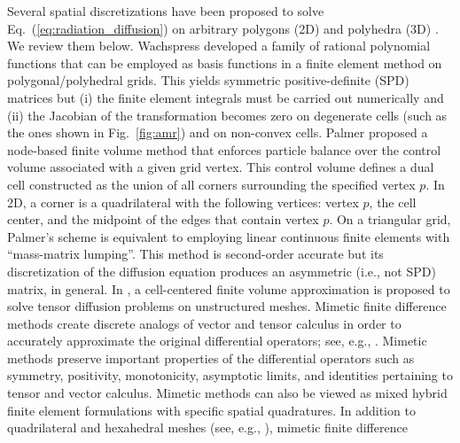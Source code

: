 \documentclass[preprint,10pt]{elsarticle}
\newcommand{\eqt}[1]{Eq.~(\ref{#1})}                     %
\newcommand{\fig}[1]{Fig.~\ref{#1}}                      %
\begin{document}
Several spatial discretizations have been proposed to solve \eqt{eq:radiation_diffusion} on
arbitrary polygons (2D) and polyhedra (3D) \cite{Wachspress,Palmer2001,Kuznetsov2004,Brezzi2005,
LipnikovShashkovSvyatskiy2006,BaileyPhD,BaileyAdams2008,LipnikovShashkov2010}. We review them below.
%
Wachspress \cite{Wachspress} developed a family of rational polynomial functions that can be employed
as basis functions in a finite element method on polygonal/polyhedral grids. This yields
symmetric positive-definite (SPD) matrices but (i) the finite element integrals must be carried out 
numerically and (ii) the Jacobian of the transformation becomes zero on degenerate cells 
(such as the ones shown in \fig{fig:amr}) and on non-convex cells. 
%
Palmer \cite{Palmer2001,PalmerLLNL} proposed a node-based finite volume method 
that enforces particle balance over the control volume associated with a given grid vertex.
This control volume defines a dual cell constructed as 
the union of all corners surrounding the specified vertex $p$. In 2D, a corner 
is a quadrilateral with the following vertices: vertex $p$, the cell center, and the midpoint
of the edges that contain vertex $p$. On a triangular grid, Palmer's scheme is equivalent 
to employing linear continuous finite elements with ``mass-matrix lumping''. This method is 
second-order accurate but its discretization of the diffusion equation produces an 
asymmetric (i.e., not SPD) matrix, in general.
%
In \cite{Herbin2006}, a cell-centered finite volume approximation is proposed to solve tensor diffusion problems
on unstructured meshes.
%
Mimetic finite difference methods create discrete analogs of vector and tensor
calculus in order to accurately approximate the original differential operators;
see, e.g., \cite{HymanMorelShashkovSteinberg2002}.
Mimetic methods preserve important properties of the differential operators such 
as symmetry, positivity, monotonicity, asymptotic limits, and identities pertaining 
to tensor and vector calculus. Mimetic methods can also be viewed as mixed hybrid 
finite element formulations with specific spatial quadratures.  
In addition to quadrilateral and hexahedral meshes (see, e.g., 
\cite{MorelRobertsShashkov1998,MorelHallShashkov2001}), mimetic finite difference 
\end{document}
